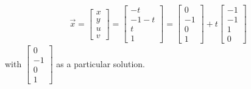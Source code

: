 \begin{solution}
\begin{align*}
\vec{x} = 
\begin{bmatrix}
x \\
y \\
u \\
v
\end{bmatrix} 
=
\begin{bmatrix}
-t \\
-1-t \\
t \\
1
\end{bmatrix}
=
\begin{bmatrix}
0 \\
-1 \\
0 \\
1
\end{bmatrix}
+ t
\begin{bmatrix}
-1 \\
-1 \\
1 \\
0
\end{bmatrix}
\end{align*}
with 
$\begin{bmatrix}
0 \\
-1 \\
0 \\
1    
\end{bmatrix}$ as a particular solution.
\end{solution}

